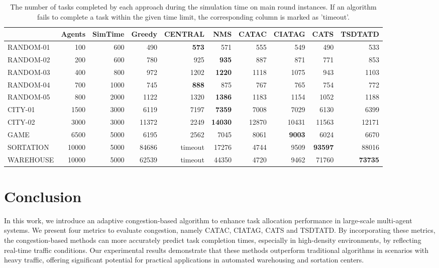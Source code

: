 \documentclass[letterpaper]{article} %
\begin{document}
\begin{table*}[t]
\centering
\caption{The number of tasks completed by each approach during the simulation time on main round instances. 
If an algorithm fails to complete a task within the given time limit, the corresponding column is marked as 'timeout'.}
\label{tab:experimental_results}
\begin{tabular}{lrrrrrrrrr}
    \toprule %
     & Agents &SimTime & Greedy & CENTRAL & NMS & CATAC & CIATAG & CATS & TSDTATD \\ \midrule %
    RANDOM-01 & 100 & 600 & 490 & \textbf{573} & 571 & 555 & 549 & 490 & 533 \\
    RANDOM-02 & 200 & 600 & 780 & 925 & \textbf{935} & 887 & 871 & 771 & 853 \\
    RANDOM-03 & 400 & 800 & 972 & 1202 & \textbf{1220} & 1118 & 1075 & 943 & 1103 \\
    RANDOM-04 & 700 & 1000 & 745 & \textbf{888} & 875 & 767 & 765 & 754 & 772 \\
    RANDOM-05 & 800 & 2000 & 1122 & 1320 & \textbf{1386} & 1183 & 1154 & 1052 & 1188 \\
    CITY-01 & 1500 & 3000 & 6119 & 7197 & \textbf{7359} & 7008 & 7029 & 6130 & 6399 \\
    CITY-02 & 3000 & 3000 & 11372 & 2249 & \textbf{14030} & 12870 & 10431 & 11563 & 12171 \\
    GAME & 6500 & 5000 & 6195 & 2562 & 7045 & 8061 & \textbf{9003} & 6024 & 6670 \\
    SORTATION & 10000 & 5000 & 84686 & timeout & 17276 & 4744 & 9509 & \textbf{93597} & 88016 \\
    WAREHOUSE & 10000 & 5000 & 62539 & timeout & 44350 & 4720 & 9462 & 71760 & \textbf{73735} \\ \bottomrule %
\end{tabular}
\end{table*}

\section{Conclusion}
In this work, we introduce an adaptive congestion-based algorithm to enhance task allocation performance in large-scale multi-agent systems. 
We present four metrics to evaluate congestion, namely CATAC, CIATAG, CATS and TSDTATD. 
By incorporating these metrics, the congestion-based methods can more accurately predict task completion times, especially in high-density environments, by reflecting real-time traffic conditions. 
Our experimental results demonstrate that these methods outperform traditional algorithms in scenarios with heavy traffic, offering significant potential for practical applications in automated warehousing and sortation centers. 


\appendix


\end{document}
